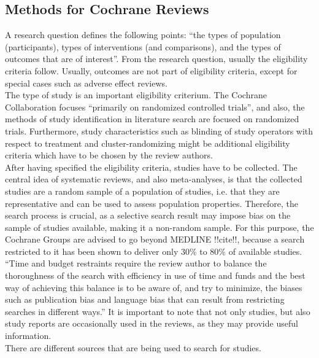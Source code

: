 \documentclass[11pt,a4paper,twoside]{book}\usepackage[]{graphicx}\usepackage[]{color}
\begin{document}
\subsection{Methods for Cochrane Reviews}
A research question defines the following points: ``the types of population (participants), types of interventions (and comparisons), and the types of outcomes that are of interest''. From the research question, usually the eligibility criteria follow. Usually, outcomes are not part of eligibility criteria, except for special cases such as adverse effect reviews. \\
The type of study is an important eligibility criterium. The Cochrane Collaboration focuses ``primarily on randomized controlled trials'', and also, the methods of study identification in literature search are focused on randomized trials. Furthermore, study characteristics such as blinding of study operators with respect to treatment and cluster-randomizing might be additional eligibility criteria which have to be chosen by the review authors. \\
After having specified the eligibility criteria, studies have to be collected. The central idea of systematic reviews, and also meta-analyses, is that the collected studies are a random sample of a population of studies, i.e. that they are representative and can be used to assess population properties. Therefore, the search process is crucial, as a selective search result may impose bias on the sample of studies available, making it a non-random sample. For this purpose, the Cochrane Groups are advised to go beyond MEDLINE !!cite!!, because a search restricted to it has been shown to deliver only 30\% to 80\% of available studies. ``Time and budget restraints require the review author to balance the thoroughness of the search with efficiency in use of time and funds and the best way of achieving this balance is to be aware of, and try to minimize, the biases such as publication bias and language bias that can result from restricting searches in different ways.'' It is important to note that not only studies, but also study reports are occasionally used in the reviews, as they may provide useful information. \\
There are different sources that are being used to search for studies. 
\end{document}
